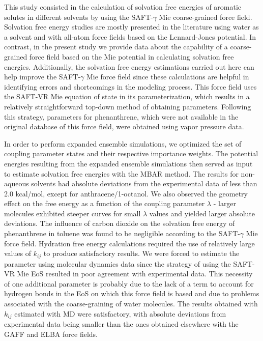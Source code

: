 \documentclass[final,12p,times,twocolumn]{elsarticle}
\begin{document}
	This study consisted in the calculation of solvation free energies of aromatic solutes in different solvents by using the SAFT-$\gamma$ Mie coarse-grained force field. Solvation free energy studies are mostly presented in the literature using water as a solvent and with all-atom force fields based on the Lennard-Jones potential. In contrast, in the present study we provide data about the capability of a coarse-grained force field based on the Mie potential in calculating solvation free energies. Additionally, the solvation free energy estimations carried out here can help improve the SAFT-$\gamma$ Mie force field since these calculations are helpful in identifying errors and shortcomings in the modeling process. This force field uses the SAFT-VR Mie equation of state in its parameterization, which results in a relatively straightforward top-down method of obtaining parameters. Following this strategy, parameters for phenanthrene, which were not available in the original database of this force field, were obtained using vapor pressure data.

	In order to perform expanded ensemble simulations, we optimized the set of coupling parameter states and their respective importance weights. The potential energies resulting from the expanded ensemble simulations then served as input to estimate solvation free energies with the MBAR method. The results for non-aqueous solvents had absolute deviations from the experimental data of less than 2.0 kcal/mol, except for anthracene/1-octanol. We also observed the geometry effect on the free energy as a function of the coupling parameter $\lambda$ - larger molecules exhibited steeper curves for small $\lambda$ values and yielded larger absolute deviations. The influence of carbon dioxide on the solvation free energy of phenanthrene in toluene was found to be negligible according to the SAFT-$\gamma$ Mie force field. Hydration free energy calculations required the use of relatively large values of $k_{ij}$ to produce satisfactory results. We were forced to estimate the parameter using molecular dynamics data since the strategy of using the SAFT-VR Mie EoS resulted in poor agreement with experimental data.
	This necessity of one additional parameter is probably due to the lack of a term to account for hydrogen bonds in the EoS on which this force field is based and due to problems associated with the coarse-graining of water molecules. The results obtained with $k_{ij}$ estimated with MD were satisfactory, with absolute deviations from experimental data being smaller than the ones obtained elsewhere with the GAFF and ELBA force fields.
\end{document}
